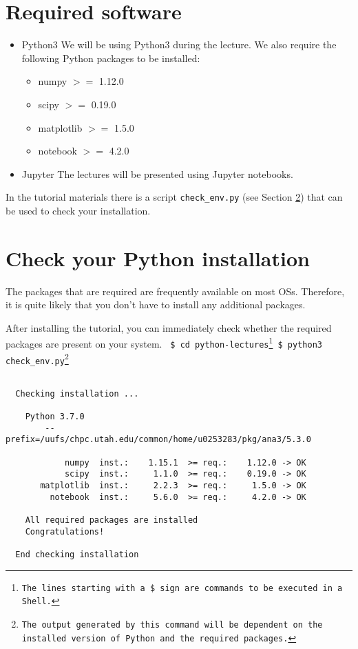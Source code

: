 \documentclass[11pt]{article}
\begin{document}
\section{Required software}\label{section:run}
\begin{itemize}
  \item Python$3$ \newline
        We will be using Python$3$ during the lecture.
        We also require the following Python packages to be installed:
        \begin{itemize}
           \item numpy $>=$ 1.12.0 
           \item scipy $>=$ 0.19.0
           \item matplotlib $>=$ 1.5.0
           \item notebook $>=$ 4.2.0
        \end{itemize} 

  \item Jupyter \newline
        The lectures will be presented using Jupyter notebooks.
\end{itemize}

In the tutorial materials there is a script \texttt{check\_env.py} 
(see Section \ref{section:check}) that can be used to check your installation.


\section{Check your Python installation}\label{section:check}
The packages that are required are frequently available 
on most OSs.
Therefore, it is quite likely that you don't have to install any additional packages.

After installing the tutorial, you can immediately check whether the required packages 
are present on your system. \newline\newline
\texttt{
\$ cd python-lectures\footnote{The lines starting with a \$ sign are commands to be executed in a Shell.} \newline
\$ python3 check\_env.py\footnote{The output generated by this command will be dependent on the installed version of Python and the required packages.}\newline
}
\begin{verbatim}

  Checking installation ...

    Python 3.7.0
        --prefix=/uufs/chpc.utah.edu/common/home/u0253283/pkg/ana3/5.3.0

            numpy  inst.:    1.15.1  >= req.:    1.12.0 -> OK 
            scipy  inst.:     1.1.0  >= req.:    0.19.0 -> OK 
       matplotlib  inst.:     2.2.3  >= req.:     1.5.0 -> OK 
         notebook  inst.:     5.6.0  >= req.:     4.2.0 -> OK 

    All required packages are installed
    Congratulations!

  End checking installation
\end{verbatim}
\end{document}
